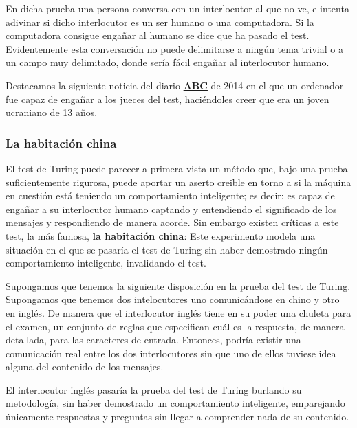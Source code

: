 \vspace{10px}

En dicha prueba una persona conversa con un interlocutor al que no ve, e intenta adivinar si dicho interlocutor es un ser humano o una computadora. Si la computadora consigue engañar al humano se dice que ha pasado el test. Evidentemente esta conversación no puede delimitarse a ningún tema trivial o a un campo muy delimitado, donde sería fácil engañar al interlocutor humano.

\vspace{10px}

Destacamos la siguiente noticia del diario \href{https://www.abc.es/ciencia/20140609/abci-superordenador-supera-primera-test-201406091139.html}{\textbf{ABC}} de 2014 en el que un ordenador fue capaz de engañar a los jueces del test, haciéndoles creer que era un joven ucraniano de 13 años.


\subsubsection{La habitación china}

El test de Turing puede parecer a primera vista un método que, bajo una prueba suficientemente rigurosa, puede aportar un aserto creible en torno a si la máquina en cuestión está teniendo un comportamiento inteligente; es decir: es capaz de engañar a su interlocutor humano captando y entendiendo el significado de los mensajes y respondiendo de manera acorde. Sin embargo existen críticas a este test, la más famosa, \textbf{la habitación china}: Este experimento modela una situación en el que se pasaría el test de Turing sin haber demostrado ningún comportamiento inteligente, invalidando el test.

Supongamos que tenemos la siguiente disposición en la prueba del test de Turing. Supongamos que tenemos dos intelocutores uno comunicándose en chino y otro en inglés. De manera que el interlocutor inglés tiene en su poder una chuleta para el examen, un conjunto de reglas que especifican cuál es la respuesta, de manera detallada, para las caracteres de entrada. Entonces, podría existir una comunicación real entre los dos interlocutores sin que uno de ellos tuviese idea alguna del contenido de los mensajes.

\vspace{10px}

El interlocutor inglés pasaría la prueba del test de Turing burlando su metodología, sin haber demostrado un comportamiento inteligente, emparejando únicamente respuestas y preguntas sin llegar a comprender nada de su contenido.

